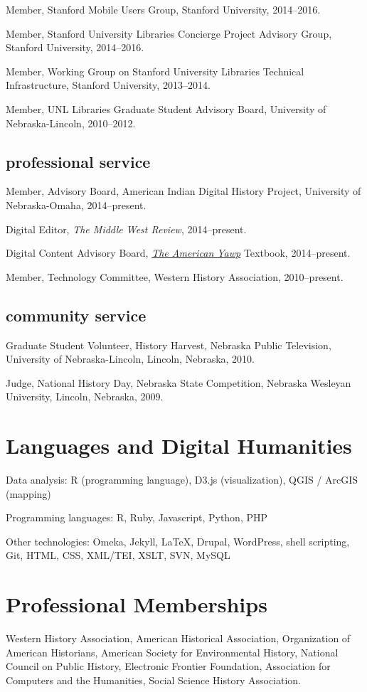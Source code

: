 Member, Stanford Mobile Users Group, Stanford University, 2014--2016.

Member, Stanford University Libraries Concierge Project Advisory Group,
Stanford University, 2014--2016.

Member, Working Group on Stanford University Libraries Technical
Infrastructure, Stanford University, 2013--2014.

Member, UNL Libraries Graduate Student Advisory Board, University of
Nebraska-Lincoln, 2010--2012.

\subsection{professional service}\label{professional-service}

Member, Advisory Board, American Indian Digital History Project,
University of Nebraska-Omaha, 2014--present.

Digital Editor, \emph{The Middle West Review}, 2014--present.

Digital Content Advisory Board, \emph{\href{http://americanyawp.com}{The
American Yawp}} Textbook, 2014--present.

Member, Technology Committee, Western History Association,
2010--present.

\subsection{community service}\label{community-service}

Graduate Student Volunteer, History Harvest, Nebraska Public Television,
University of Nebraska-Lincoln, Lincoln, Nebraska, 2010.

Judge, National History Day, Nebraska State Competition, Nebraska
Wesleyan University, Lincoln, Nebraska, 2009.

\section{Languages and Digital
Humanities}\label{languages-and-digital-humanities}

Data analysis: R (programming language), D3.js (visualization), QGIS /
ArcGIS (mapping)

Programming languages: R, Ruby, Javascript, Python, PHP

Other technologies: Omeka, Jekyll, \LaTeX, Drupal, WordPress, shell
scripting, Git, HTML, CSS, XML/TEI, XSLT, SVN, MySQL

\newpage

\section{Professional Memberships}\label{professional-memberships}

Western History Association, American Historical Association,
Organization of American Historians, American Society for Environmental
History, National Council on Public History, Electronic Frontier
Foundation, Association for Computers and the Humanities, Social Science
History Association.
